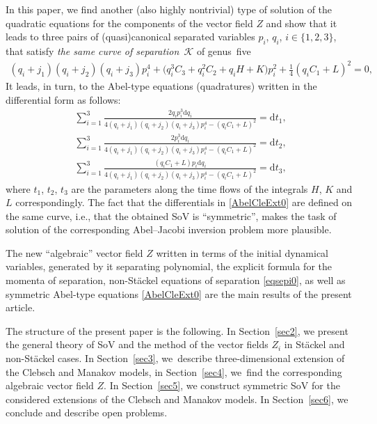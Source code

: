 \documentclass[10pt,a4paper]{amsart}
\numberwithin{equation}{section}
\begin{document}
 In this paper, we find another (also highly nontrivial) type of solution of the quadratic equations for the components of the vector field $Z$ and show that it leads to three pairs of (quasi)canonical separated variables $p_i$, $q_i$, $i\in \{1,2,3\}$, that
satisfy {\it the same curve of separation}~$\mathcal{K}$ of genus~five
\begin{gather}
(q_i+j_1)(q_i+j_2)(q_i+j_3) p_i^4+\big(q_i^3 C_3+q_i^2 C_2+ q_i H+K \big) p_i^2+ \frac{1}{4}(q_i C_1+L)^2=0,
\label{eqsepi0}
\end{gather}
It leads, in turn, to the Abel-type equations (quadratures) written in the differential form as follows:
\begin{subequations}\label{AbelCleExt0}
\begin{gather}
\sum\limits_{i=1}^3 \frac{2 q_i p_i^3 \mathrm{d}q_i}{ 4 (q_i+j_1) (q_i+j_2)(q_i+j_3) p^4_i-(q_i C_1+L)^2} = \mathrm{d} t_1,
\\
\sum\limits_{i=1}^3 \frac{2 p_i^3 \mathrm{d} q_i}{ 4 (q_i+j_1) (q_i+j_2)(q_i+j_3) p^4_i-(q_i C_1+L)^2} = \mathrm{d} t_2,
\\
\sum\limits_{i=1}^3 \frac{ (q_i C_1+L) p_i \mathrm{d} q_i}{ 4 (q_i+j_1) (q_i+j_2)(q_i+j_3) p^4_i-(q_i C_1+L)^2} = \mathrm{d} t_3,
\end{gather}
\end{subequations}
where $t_1$, $t_2$, $t_3$ are the parameters along the time flows of the integrals $H$, $K$ and $L$ correspondingly.
The fact that the differentials in \eqref{AbelCleExt0} are defined on the same curve, i.e., that the obtained SoV is ``symmetric'', makes the task of solution of the corresponding Abel--Jacobi inversion problem more plausible.

 The new ``algebraic'' vector field $Z$ written in terms of the initial dynamical variables, generated by it separating polynomial, the explicit formula for the momenta of separation, non-St\"ackel equations of separation \eqref{eqsepi0}, as well as symmetric Abel-type equations \eqref{AbelCleExt0} are the main results of the present article.

 The structure of the present paper is the following. In Section~\ref{sec2}, we present the general theory of SoV and the method of the vector fields $Z_i$ in St\"ackel and non-St\"ackel cases. In Section~\ref{sec3}, we~describe three-dimensional extension of the Clebsch and Manakov models, in Section~\ref{sec4}, we~find the corresponding algebraic vector field $Z$. In Section~\ref{sec5}, we construct symmetric SoV for the considered extensions of the Clebsch and Manakov models. In Section~\ref{sec6}, we conclude and describe open problems.
\end{document}
